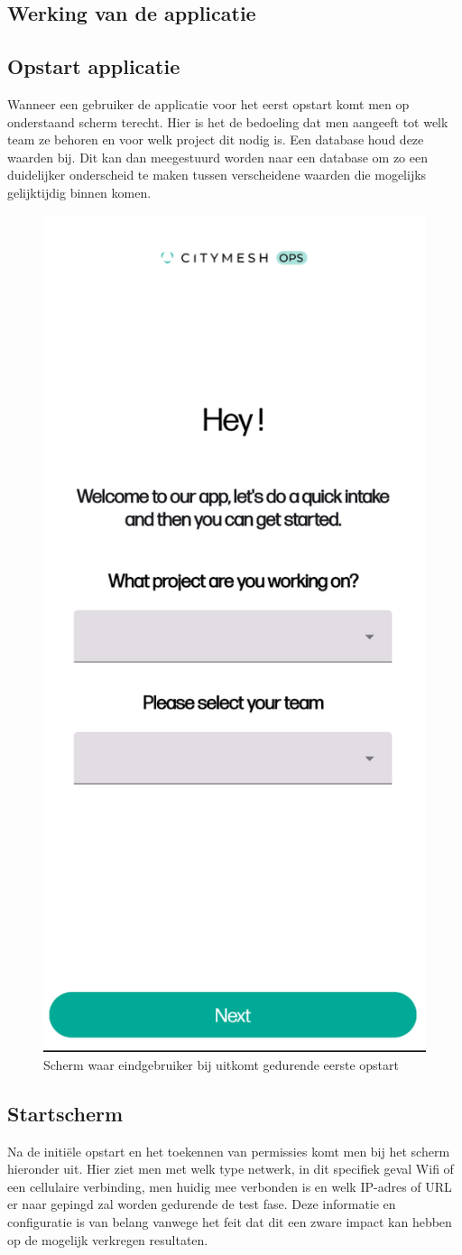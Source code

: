 \subsection{Werking van de applicatie}

\subsection{Opstart applicatie}

Wanneer een gebruiker de applicatie voor het eerst opstart komt men op onderstaand scherm terecht. Hier is het de bedoeling dat men aangeeft tot welk team ze behoren en voor welk project dit nodig is. Een database houd deze waarden bij. Dit kan dan meegestuurd worden naar een database om zo een duidelijker onderscheid te maken tussen verscheidene waarden die mogelijks gelijktijdig binnen komen. 

\begin{figure}[!htb]
    \includegraphics[width=0.3\linewidth]{graphics/startscreen}
    \caption[Scherm waar eindgebruiker bij uitkomt gedurende eerste opstart]{Scherm waar eindgebruiker bij uitkomt gedurende eerste opstart}
    \label{fig:startscreen}
\end{figure}

\subsection{Startscherm}

Na de initiële opstart en het toekennen van permissies komt men bij het scherm hieronder uit. Hier ziet men met welk type netwerk, in dit specifiek geval Wifi of een cellulaire verbinding, men huidig mee verbonden is en welk IP-adres of URL er naar gepingd zal worden gedurende de test fase. Deze informatie en configuratie is van belang vanwege het feit dat dit een zware impact kan hebben op de mogelijk verkregen resultaten.

